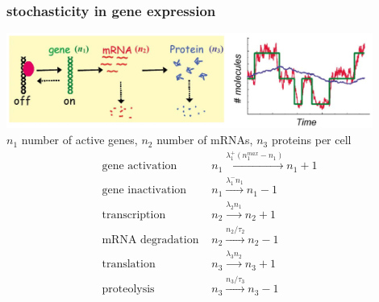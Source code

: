 \begin{frame}
\frametitle{stochasticity in gene expression}
\begin{center}
\includegraphics[width=0.9\textwidth]{fig/stochgeneexpdyn.png}\\

{\scriptsize
$n_1$ number of active genes, $n_2$ number of mRNAs, $n_3$ proteins per cell
\begin{align*}
\text{gene activation } &n_1 \xrightarrow{\lambda_1^+ (n_1^{max}-n_1)}n_1+1\\
\text{gene inactivation } &n_1 \xrightarrow{\lambda_1^- n_1}n_1-1\\
\text{transcription } &n_2 \xrightarrow{\lambda_2 n_1}n_2+1\\
\text{mRNA degradation } &n_2 \xrightarrow{n_2/\tau_2}n_2-1\\
\text{translation } &n_3 \xrightarrow{\lambda_3 n_2}n_3+1\\
\text{proteolysis } &n_3 \xrightarrow{n_3/\tau_3}n_3-1
\end{align*}}
\end{center}
\hfill \cite{Paulsson2005}
\end{frame}

